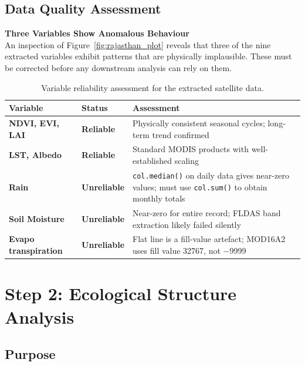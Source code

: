 \documentclass[12pt, a4paper]{article}
\begin{document}
\subsection{Data Quality Assessment}
\label{sec:dataquality}

\begin{mdframed}[style=warnbox]
\textbf{\textcolor{warnred}{Three Variables Show Anomalous Behaviour}}\\[4pt]
An inspection of Figure~\ref{fig:rajasthan_plot} reveals that three of the
nine extracted variables exhibit patterns that are physically implausible.
These must be corrected before any downstream analysis can rely on them.
\end{mdframed}

\begin{table}[H]
\centering
\caption{Variable reliability assessment for the extracted satellite data.}
\label{tab:quality}
\begin{tabularx}{\textwidth}{>{\bfseries}p{3.2cm} p{2.2cm} X}
\toprule
Variable & Status & Assessment \\
\midrule
NDVI, EVI, LAI &
\textcolor{notegreen}{\textbf{Reliable}} &
Physically consistent seasonal cycles; long-term trend confirmed \\[4pt]
LST, Albedo &
\textcolor{notegreen}{\textbf{Reliable}} &
Standard MODIS products with well-established scaling \\[6pt]
Rain &
\textcolor{warnred}{\textbf{Unreliable}} &
\texttt{col.median()} on daily data gives near-zero values;
must use \texttt{col.sum()} to obtain monthly totals \\[4pt]
Soil Moisture &
\textcolor{warnred}{\textbf{Unreliable}} &
Near-zero for entire record; FLDAS band extraction likely
failed silently \\[4pt]
Evapo transpiration &
\textcolor{warnred}{\textbf{Unreliable}} &
Flat line is a fill-value artefact; MOD16A2 uses fill
value 32767, not $-$9999 \\
\bottomrule
\end{tabularx}
\end{table}

\section{Step 2: Ecological Structure Analysis}

\subsection{Purpose}
\end{document}
